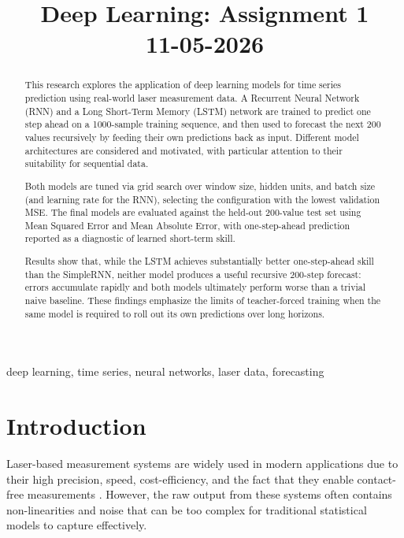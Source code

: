 \documentclass[conference]{IEEEtran}
\begin{document}
\title{Deep Learning: Assignment 1\\
{\footnotesize 11-05-2026}
}

\author{
}



\maketitle

\begin{abstract}

This research explores the application of deep learning models for time series prediction using real-world laser measurement data. A Recurrent Neural Network (RNN) and a Long Short-Term Memory (LSTM) network are trained to predict one step ahead on a 1000-sample training sequence, and then used to forecast the next 200 values recursively by feeding their own predictions back as input. Different model architectures are considered and motivated, with particular attention to their suitability for sequential data.

Both models are tuned via grid search over window size, hidden units, and batch size (and learning rate for the RNN), selecting the configuration with the lowest validation MSE. The final models are evaluated against the held-out 200-value test set using Mean Squared Error and Mean Absolute Error, with one-step-ahead prediction reported as a diagnostic of learned short-term skill.

Results show that, while the LSTM achieves substantially better one-step-ahead skill than the SimpleRNN, neither model produces a useful recursive 200-step forecast: errors accumulate rapidly and both models ultimately perform worse than a trivial naive baseline. These findings emphasize the limits of teacher-forced training when the same model is required to roll out its own predictions over long horizons.

\end{abstract}

\begin{IEEEkeywords}
deep learning, time series, neural networks, laser data, forecasting
\end{IEEEkeywords}

\section{Introduction}
Laser-based measurement systems are widely used in modern applications due to their high precision, speed, cost-efficiency, and the fact that they enable contact-free measurements \cite{b1}. However, the raw output from these systems often contains non-linearities and noise that can be too complex for traditional statistical models to capture effectively. 
\end{document}
